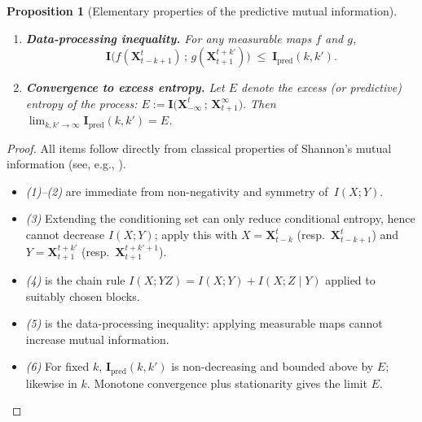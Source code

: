 \documentclass{article}
\newtheorem{proposition}[theorem]{Proposition}
\begin{document}
\begin{proposition}[Elementary properties of the predictive mutual information]
\begin{enumerate}
    \item \textbf{Data-processing inequality.}\;
          For any measurable maps $f$ and $g$,
          \[
            \mathbf I\!\bigl(
               f(\mathbf X_{t-k+1}^{t})\,;\,
               g(\mathbf X_{t+1}^{t+k'})
            \bigr)
            \;\le\;
            \mathbf I_{\mathrm{pred}}(k,k').
          \]

    \item \textbf{Convergence to excess entropy.}\;
          Let $E$ denote the excess (or predictive) entropy of the process:
          \(
             E := \mathbf I\!\bigl(\mathbf X_{-\infty}^{t}\,;\,
                                   \mathbf X_{t+1}^{\infty}\bigr).
          \)
          Then  
          $\displaystyle\lim_{k,k'\to\infty}\mathbf I_{\mathrm{pred}}(k,k') = E$.
\end{enumerate}
\end{proposition}

\begin{proof}
All items follow directly from classical properties of Shannon’s
mutual information (see, e.g., \cite[Chs.~2–3]{cover1999elements}).

\begin{itemize}
    \item \emph{(1)–(2)} are immediate from non-negativity and symmetry of~$I(X;Y)$.

    \item \emph{(3)}  
          Extending the conditioning set can only reduce conditional entropy,
          hence cannot decrease $I(X;Y)$; apply this with  
          $X=\mathbf X_{t-k}^{t}$ (resp.\ $\mathbf X_{t-k+1}^{t}$) and  
          $Y=\mathbf X_{t+1}^{t+k'}$ (resp.\ $\mathbf X_{t+1}^{t+k'+1}$).

    \item \emph{(4)} is the chain rule
          $I(X;YZ)=I(X;Y)+I(X;Z\mid Y)$
          applied to suitably chosen blocks.

    \item \emph{(5)} is the data-processing inequality:
          applying measurable maps cannot increase mutual information.

    \item \emph{(6)}  
          For fixed $k$, $\mathbf I_{\mathrm{pred}}(k,k')$ is non-decreasing and
          bounded above by $E$; likewise in $k$.  
          Monotone convergence plus stationarity gives the limit $E$.
\end{itemize}
\end{proof}
\end{document}
